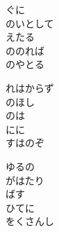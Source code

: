 \documentclass[10pt,b5j]{tarticle} %
\begin{document}
\vspace{1.5em} %
\newcommand{\linespace}{0.5em} %
\newcommand{\blocksize}{0.5\hsize} %
\begin{enumerate} %
    \begin{minipage}[c]{\blocksize}
    
        \vspace{\linespace}
        \item
        ぐに\\
        のいとして\\
        えたる\\
        ののれば\\
        のやとる
        
        \vspace{\linespace}
        \item
        れはからず\\
        のほし\\
        のは\\
        にに\\
        すはのぞ
        
        \vspace{\linespace}
        \item
        ゆるの\\
        がはたり\\
        ばす\\
        ひてに\\
        をくさんし
    
    \end{minipage}
\end{enumerate} %
\end{document}
